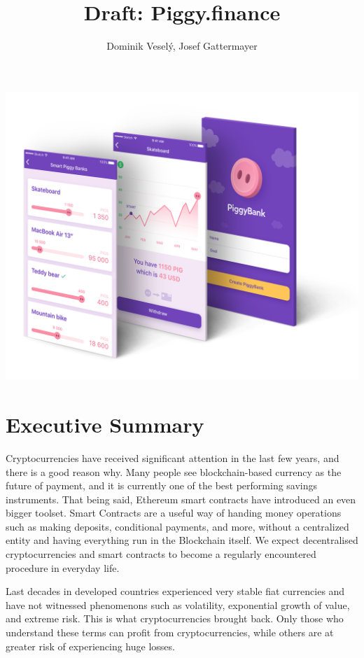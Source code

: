 \documentclass[english]{article}
\begin{document}
\title{Draft: Piggy.finance}

\author{Dominik Veselý, Josef Gattermayer}

\maketitle
\thispagestyle{fancy}

\hfill
\hfill
\hfill

\includegraphics[scale=0.25]{Screeny.png}


\newpage
\tableofcontents
\newpage

\section{Executive Summary}

Cryptocurrencies have received significant attention in the last few years, and there is a good reason why. Many people see blockchain-based currency as the future of payment, and it is currently one of the best performing savings instruments. That being said, Ethereum smart contracts have introduced an even bigger toolset. Smart Contracts are a useful way of handing money operations such as making deposits, conditional payments, and more, without a centralized entity and having everything run in the Blockchain itself. We expect decentralised cryptocurrencies and smart contracts to become a regularly encountered procedure in everyday life.

Last decades in developed countries experienced very stable fiat currencies and have not witnessed phenomenons such as volatility, exponential growth of value, and extreme risk. This is what cryptocurrencies brought back. Only those who understand these terms can profit from cryptocurrencies, while others are at greater risk of experiencing huge losses.
\end{document}
